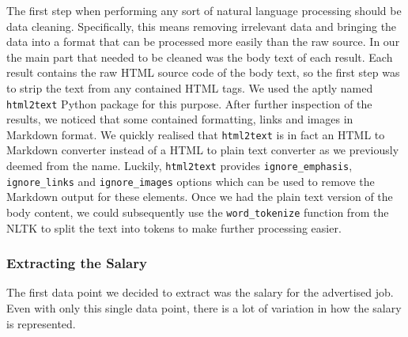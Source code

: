 \documentclass[runningheads]{llncs}
\begin{document}
The first step when performing any sort of natural language processing should be data cleaning. Specifically, this means removing irrelevant data and bringing the data into a format that can be processed more easily than the raw source. In our the main part that needed to be cleaned was the body text of each result. Each result contains the raw HTML source code of the body text, so the first step was to strip the text from any contained HTML tags. We used the aptly named \texttt{html2text} Python package for this purpose. After further inspection of the results, we noticed that some contained formatting, links and images in Markdown format. We quickly realised that \texttt{html2text} is in fact an HTML to Markdown converter instead of a HTML to plain text converter as we previously deemed from the name. Luckily, \texttt{html2text} provides \texttt{ignore\_emphasis}, \texttt{ignore\_links} and \texttt{ignore\_images} options which can be used to remove the Markdown output for these elements. Once we had the plain text version of the body content, we could subsequently use the \texttt{word\_tokenize} function from the NLTK to split the text into tokens to make further processing easier.

\subsubsection{Extracting the Salary}
\label{subsub:extracting_the_salary}

The first data point we decided to extract was the salary for the advertised job. Even with only this single data point, there is a lot of variation in how the salary is represented.
\end{document}
